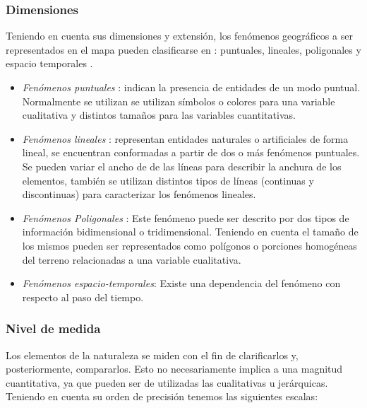 \subsubsection{Dimensiones}
Teniendo en cuenta sus dimensiones y extensión, los fenómenos geográficos a ser representados en el
mapa pueden clasificarse en : puntuales, lineales, poligonales y espacio temporales
\citep{fAlonsoSig2006}.

\begin{itemize}
    \item \textit{Fenómenos puntuales} : indican la presencia de entidades de un modo puntual. Normalmente se utilizan se utilizan símbolos o colores para una variable cualitativa y distintos tamaños para las variables cuantitativas.

    \item \textit{Fenómenos lineales} : representan entidades naturales o artificiales de forma lineal, se encuentran conformadas a partir de dos o más fenómenos puntuales. Se pueden variar el ancho de de las líneas para describir la anchura de los elementos, también se utilizan distintos tipos de líneas (continuas y discontinuas) para caracterizar los fenómenos lineales.

    \item \textit{Fenómenos Poligonales} : Este fenómeno puede ser descrito por dos tipos de información bidimensional o tridimensional. Teniendo en cuenta el tamaño de los mismos pueden ser representados como polígonos o porciones homogéneas del terreno relacionadas a una variable cualitativa.

    \item \textit{Fenómenos espacio-temporales}: Existe una dependencia del fenómeno con respecto al paso del tiempo.
\end{itemize}

\subsubsection{Nivel de medida}

Los elementos de la naturaleza se miden con el fin de clarificarlos y, posteriormente, compararlos.
Esto no necesariamente implica a una magnitud cuantitativa, ya que pueden ser de utilizadas las
cualitativas u jerárquicas\citep{fomentoConceptos2010}. Teniendo en cuenta su orden de precisión
tenemos las siguientes escalas:

